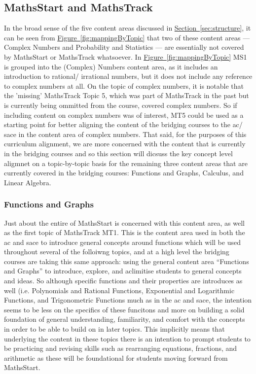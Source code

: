 \documentclass[twoside,12pt,a4paper]{report}
\newcommand{\refsec}[1]{\hyperref[sec:#1]{Section~\ref{sec:#1}}}
\newcommand{\reffig}[1]{\hyperref[fig:#1]{Figure~\ref{fig:#1}}}
\begin{document}
\subsection{MathsStart and MathsTrack}

In the broad sense of the five content areas discussed in \refsec{structure}, it can be seen from \reffig{mappingByTopic} that two of these content areas --- Complex Numbers and Probability and Statistics --- are essentially not covered by MathsStart or MathsTrack whatsoever. In \reffig{mappingByTopic} MS1 is grouped into the (Complex) Numbers content area, as it includes an introduction to rational/ irrational numbers, but it does not include any reference to complex numbers at all. On the topic of complex numbers, it is notable that the 'missing' MathsTrack Topic 5, which was part of MathsTrack in the past but is currently being ommitted from the course, covered complex numbers. So if including content on complex numbers was of interest, MT5 could be used as a starting point for better aligning the content of the bridging courses to the \gls{ac}/ \gls{sace} in the content area of complex numbers. That said, for the purposes of this curriculum alignment, we are more concerned with the content that is currently in the bridging courses and so this section will dicsuss the key concept level aligmnet on a topic-by-topic basis for the remaining three content areas that are currently covered in the bridging courses: Functions and Graphs, Calculus, and Linear Algebra.

\subsubsection{Functions and Graphs} 

Just about the entire of MathsStart is concerned with this content area, as well as the first topic of MathsTrack MT1. This is the content area used in both the \gls{ac} and \gls{sace} to introduce general concepts around functions which will be used throughout several of the folloiwng topics, and at a high level the bridging courses are taking this same approach: using the general content area ``Functions and Graphs'' to introduce, explore, and aclimitise students to general concepts and ideas. So although specific functions and their properties are introduces as well (i.e. Polynomials and Rational Functions, Exponential and Logarithmic Functions, and Trigonometric Functions much as in the \gls{ac} and \gls{sace}, the intention seems to be less on the specifics of these funcitons and more on building a solid foundation of general understanding, familiarity, and comfort with the concepts in order to be able to build on in later topics. This implicitly means that underlying the content in these topics there is an intention to prompt students to be practicing and revising skills such as rearranging equations, fractions, and arithmetic as these will be foundational for students moving forward from MathsStart. 
\end{document}

